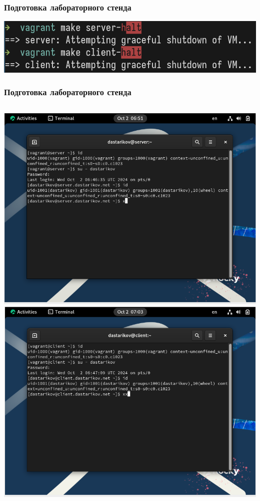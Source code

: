 \begin{frame}
\frametitle{Подготовка лабораторного стенда}
        \centering
        \includegraphics[width=\textwidth]{../images/img8.png}

\end{frame}

\begin{frame}
\frametitle{Подготовка лабораторного стенда}
\begin{columns}
        \centering
        \includegraphics[width=\textwidth]{../images/img9.png}
        \centering
        \includegraphics[width=\textwidth]{../images/img10.png}
\end{columns}
\end{frame}

